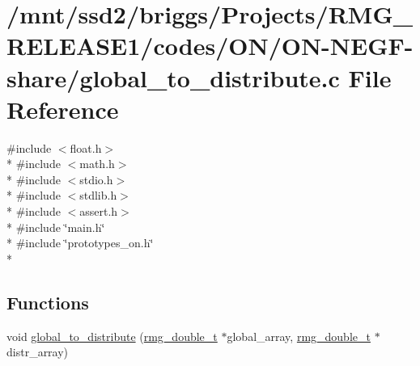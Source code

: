 \hypertarget{_o_n_2_o_n-_n_e_g_f-share_2global__to__distribute_8c}{\section{/mnt/ssd2/briggs/\-Projects/\-R\-M\-G\-\_\-\-R\-E\-L\-E\-A\-S\-E1/codes/\-O\-N/\-O\-N-\/\-N\-E\-G\-F-\/share/global\-\_\-to\-\_\-distribute.c File Reference}
\label{_o_n_2_o_n-_n_e_g_f-share_2global__to__distribute_8c}
}
{\ttfamily \#include $<$float.\-h$>$}\\*
{\ttfamily \#include $<$math.\-h$>$}\\*
{\ttfamily \#include $<$stdio.\-h$>$}\\*
{\ttfamily \#include $<$stdlib.\-h$>$}\\*
{\ttfamily \#include $<$assert.\-h$>$}\\*
{\ttfamily \#include \char`\"{}main.\-h\char`\"{}}\\*
{\ttfamily \#include \char`\"{}prototypes\-\_\-on.\-h\char`\"{}}\\*
\subsection*{Functions}
\begin{DoxyCompactItemize}
\item 
void \hyperlink{_o_n_2_o_n-_n_e_g_f-share_2global__to__distribute_8c_a087adcb8243fb06cd415fce8e53f9937}{global\-\_\-to\-\_\-distribute} (\hyperlink{rmgtypes_8h_aaa16921c14f121c56eaa42390a340db8}{rmg\-\_\-double\-\_\-t} $\ast$global\-\_\-array, \hyperlink{rmgtypes_8h_aaa16921c14f121c56eaa42390a340db8}{rmg\-\_\-double\-\_\-t} $\ast$distr\-\_\-array)
\end{DoxyCompactItemize}


